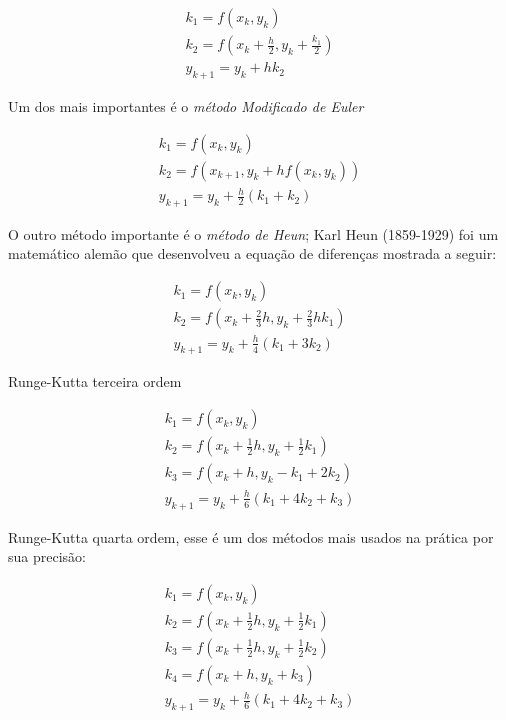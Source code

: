 \begin{equation*}
\begin{split}
k_{1} = f(x_{k},y_{k})\\
k_{2} = f(x_{k} + \frac{h}{2}, y_{k} + \frac{k_{1}}{2})\\
y_{k+1} = y_{k} + hk_{2}
\end{split}
\end{equation*}

Um dos mais importantes é o \emph{método Modificado de Euler}

\begin{equation*}
\begin{split}
k_{1} = f(x_{k}, y_{k})\\
k_{2} = f(x_{k+1}, y_{k} + hf(x_{k}, y_{k}))\\
y_{k+1} = y_{k} + \frac{h}{2}(k_{1} + k_{2})
\end{split}
\end{equation*}

O outro método importante é o \emph{método de Heun}; Karl Heun (1859-1929) foi um matemático alemão que desenvolveu a equação de diferenças mostrada a seguir:

\begin{equation*}
\begin{split}
k_{1} = f(x_{k}, y_{k})\\
k_{2} = f(x_{k} + \frac{2}{3}h, y_{k} + \frac{2}{3}hk_{1})\\
y_{k+1} = y_{k} + \frac{h}{4}(k_{1} + 3k_{2})
\end{split}
\end{equation*}

Runge-Kutta terceira ordem

\begin{equation*}
\begin{split}
k_{1} = f(x_{k}, y_{k})\\
k_{2} = f(x_{k} + \frac{1}{2}h, y_{k} + \frac{1}{2}k_{1})\\
k_{3} = f(x_{k} + h, y_{k} - k_{1} + 2k_{2})\\
y_{k+1} = y_{k} + \frac{h}{6}(k_{1} + 4k_{2} + k_{3})
\end{split}
\end{equation*}

Runge-Kutta quarta ordem, esse é um dos métodos mais usados na prática por sua precisão:

\begin{equation*}
\begin{split}
k_{1} = f(x_{k}, y_{k})\\
k_{2} = f(x_{k} + \frac{1}{2}h, y_{k} + \frac{1}{2}k_{1})\\
k_{3} = f(x_{k} + \frac{1}{2}h, y_{k} + \frac{1}{2}k_{2})\\
k_{4} = f(x_{k} + h, y_{k} + k_{3})\\
y_{k+1} = y_{k} + \frac{h}{6}(k_{1} + 4k_{2} + k_{3})
\end{split}
\end{equation*}

